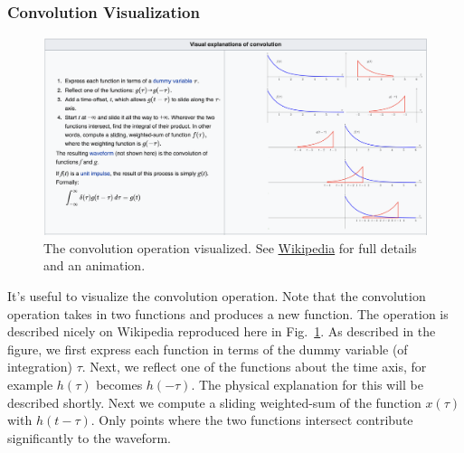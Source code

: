 \subsubsection{Convolution Visualization}
\begin{figure}[tb]
\begin{center}
\includegraphics[width=\columnwidth]{conv_picture.png} 
\end{center}
\caption{The convolution operation visualized.  See \href{https://en.wikipedia.org/wiki/Convolution}{Wikipedia} for full details and an animation. }
\label{fig:conv_visual}
\end{figure}
It's useful to visualize the convolution operation.  Note that the convolution operation takes in two functions and produces a new function.  The operation is described nicely on Wikipedia reproduced here in Fig.~\ref{fig:conv_visual}.  As described in the figure, we first express each function in terms of the dummy variable (of integration) $\tau$.  Next, we reflect one of the functions about the time axis, for example $h(\tau)$ becomes $h(-\tau)$.  The physical explanation for this will be described shortly.  Next we compute a sliding weighted-sum of the function $x(\tau)$ with $h(t-\tau)$.  Only points where the two functions intersect contribute significantly to the waveform.  
